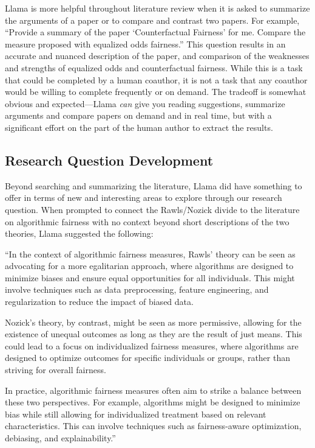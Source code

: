 Llama is more helpful throughout literature review when it is asked to summarize
the arguments of a paper or to compare and contrast two papers. For example,
``Provide a summary of the paper `Counterfactual Fairness' for me. Compare the
measure proposed with equalized odds fairness.'' This question results in an
accurate and nuanced description of the paper, and comparison of the weaknesses
and strengths of equalized odds and counterfactual fairness. While this is a 
task that could be completed by a human coauthor, it is not a task that any 
coauthor would be willing to complete frequently or on demand. The tradeoff is 
somewhat obvious and expected—Llama \emph{can} give you reading suggestions,
summarize arguments and compare papers on demand and in real time, but with 
a significant effort on the part of the human author to extract the results.

\subsection{Research Question Development}

Beyond searching and summarizing the literature, Llama did have something to
offer in terms of new and interesting areas to explore through our research question.
When prompted to connect the Rawls/Nozick divide to the literature on
algorithmic fairness with no context beyond short descriptions of the two 
theories, Llama suggested the following:

``In the context of algorithmic fairness measures, Rawls' theory can be seen as
advocating for a more egalitarian approach, where algorithms are designed to
minimize biases and ensure equal opportunities for all individuals. This might
involve techniques such as data preprocessing, feature engineering, and
regularization to reduce the impact of biased data.

Nozick's theory, by contrast, might be seen as more permissive, allowing for the
existence of unequal outcomes as long as they are the result of just means. This
could lead to a focus on individualized fairness measures, where algorithms are
designed to optimize outcomes for specific individuals or groups, rather than
striving for overall fairness.

In practice, algorithmic fairness measures often aim to strike a balance between
these two perspectives. For example, algorithms might be designed to minimize
bias while still allowing for individualized treatment based on relevant
characteristics. This can involve techniques such as fairness-aware
optimization, debiasing, and explainability.''

